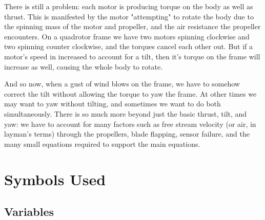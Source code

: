\documentclass{article}
\numberwithin{equation}{section} %
\begin{document}
There is still a problem: each motor is producing torque on the body as well as thrust. This is manifested by the motor "attempting" to rotate the body due to the spinning mass of the motor and propeller, and the air resistance the propeller encounters. On a quadrotor frame we have two motors spinning clockwise and two spinning counter clockwise, and the torques cancel each other out. But if a motor's speed in increased to account for a tilt, then it's torque on the frame will increase as well, causing the whole body to rotate.

And so now, when a gust of wind blows on the frame, we have to somehow correct the tilt without allowing the torque to yaw the frame. At other times we may want to yaw without tilting, and sometimes we want to do both simultaneously.  There is so much more beyond just the basic thrust, tilt, and yaw: we have to account for many factors such as free stream velocity (or air, in layman's terms) through the propellers, blade flapping, sensor failure, and the many small equations required to support the main equations.

\section{Symbols Used}

\subsection{Variables}
\end{document}
